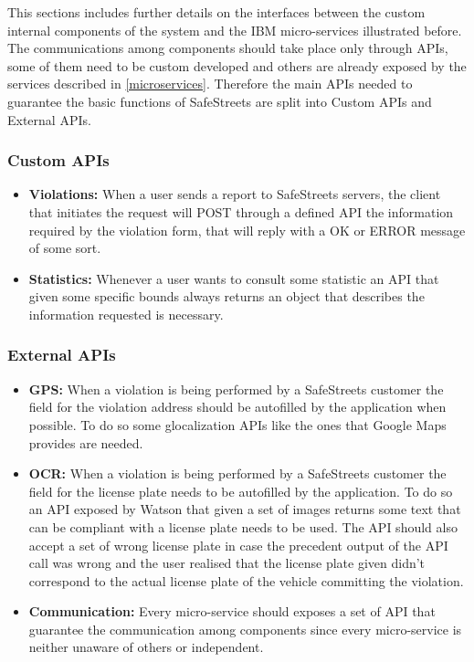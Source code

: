 This sections includes further details on the interfaces between the custom internal components of the system and the IBM micro-services illustrated before. The communications among components should take place only through APIs, some of them need to be custom developed and others are already exposed by the services described in \ref{microservices}. Therefore the main APIs needed to guarantee the basic functions of SafeStreets are split into Custom APIs and External APIs.

\subsubsection{Custom APIs}
\begin{itemize}
	\item \textbf{Violations:} When a user sends a report to SafeStreets servers, the client that initiates the request will POST through a defined API the information required by the violation form, that will reply with a OK or ERROR message of some sort. 
	\item \textbf{Statistics:} Whenever a user wants to consult some statistic an API that given some specific bounds always returns an object that describes the information requested is necessary. 
\end{itemize}

\subsubsection{External APIs}
\begin{itemize}
	\item \textbf{GPS:} When a violation is being performed by a SafeStreets customer the field for the violation address should be autofilled by the application when possible. To do so some glocalization APIs like the ones that Google Maps provides are needed.
	\item \textbf{OCR:} When a violation is being performed by a SafeStreets customer the field for the license plate needs to be autofilled by the application. To do so an API exposed by Watson that given a set of images returns some text that can be compliant with a license plate needs to be used. The API should also accept a set of wrong license plate in case the precedent output of the API call was wrong and the user realised that the license plate given didn't correspond to the actual license plate of the vehicle committing the violation.
	\item \textbf{Communication:} Every micro-service should exposes a set of API that guarantee the communication among components since every micro-service is neither unaware of others or independent.
\end{itemize}
